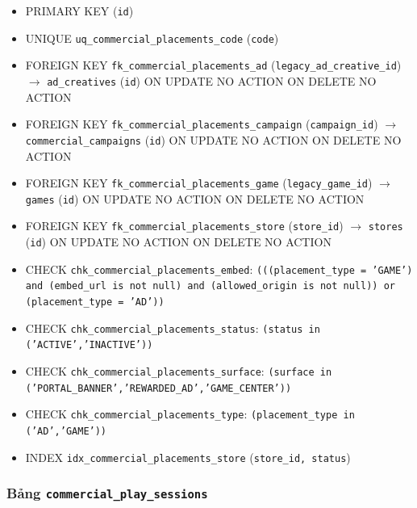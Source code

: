 \begin{itemize}

\item PRIMARY KEY (\texttt{id})

\item UNIQUE \texttt{uq\_commercial\_placements\_code} (\texttt{code})

\item FOREIGN KEY \texttt{fk\_commercial\_placements\_ad} (\texttt{legacy\_ad\_creative\_id}) $\rightarrow$ \texttt{ad\_creatives} (\texttt{id}) ON UPDATE NO ACTION ON DELETE NO ACTION

\item FOREIGN KEY \texttt{fk\_commercial\_placements\_campaign} (\texttt{campaign\_id}) $\rightarrow$ \texttt{commercial\_campaigns} (\texttt{id}) ON UPDATE NO ACTION ON DELETE NO ACTION

\item FOREIGN KEY \texttt{fk\_commercial\_placements\_game} (\texttt{legacy\_game\_id}) $\rightarrow$ \texttt{games} (\texttt{id}) ON UPDATE NO ACTION ON DELETE NO ACTION

\item FOREIGN KEY \texttt{fk\_commercial\_placements\_store} (\texttt{store\_id}) $\rightarrow$ \texttt{stores} (\texttt{id}) ON UPDATE NO ACTION ON DELETE NO ACTION

\item CHECK \texttt{chk\_commercial\_placements\_embed}: \texttt{(((placement\_type = 'GAME') and (embed\_url is not null) and (allowed\_origin is not null)) or (placement\_type = 'AD'))}

\item CHECK \texttt{chk\_commercial\_placements\_status}: \texttt{(status in ('ACTIVE','INACTIVE'))}

\item CHECK \texttt{chk\_commercial\_placements\_surface}: \texttt{(surface in ('PORTAL\_BANNER','REWARDED\_AD','GAME\_CENTER'))}

\item CHECK \texttt{chk\_commercial\_placements\_type}: \texttt{(placement\_type in ('AD','GAME'))}

\item INDEX \texttt{idx\_commercial\_placements\_store} (\texttt{store\_id, status})

\end{itemize}

\subsubsection{Bảng \texttt{commercial\_play\_sessions}}

